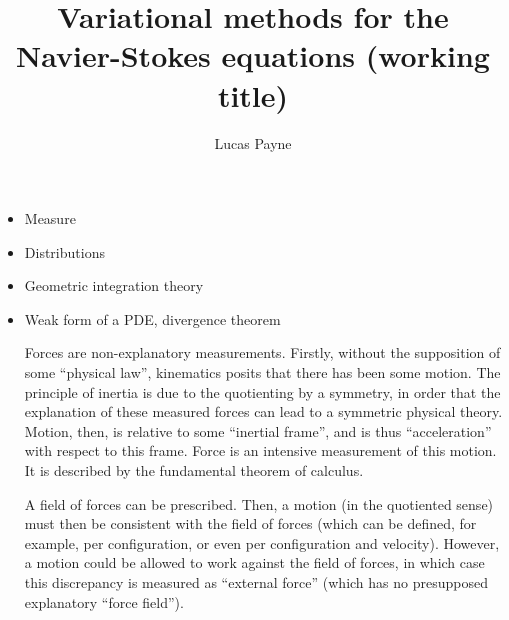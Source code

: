 \documentclass[11pt,a4paper]{memoir}
\title{Variational methods for the Navier-Stokes equations
\scriptsize{(working title)}
}
\author{Lucas Payne}
\begin{document}
\maketitle

% 
% 


\begin{itemize}

\item Measure
\item Distributions
\item Geometric integration theory
\item Weak form of a PDE, divergence theorem

Forces are non-explanatory measurements. Firstly, without the supposition of some ``physical law'',
kinematics posits that there has been some motion. The principle of inertia is due to the quotienting by a symmetry,
in order that the explanation of these measured forces can lead to a symmetric physical theory.
Motion, then, is relative to some ``inertial frame'', and is thus ``acceleration'' with respect to this frame.
Force is an intensive measurement of this motion. It is described by the fundamental theorem of calculus.

A field of forces can be prescribed.
Then, a motion (in the quotiented sense) must then be consistent with the field of forces (which can be defined, for example, per configuration, or even
per configuration and velocity). However, a motion could be allowed to work against the field of forces, in which case this discrepancy
is measured as ``external force'' (which has no presupposed explanatory ``force field'').





\end{itemize}
\end{document}
